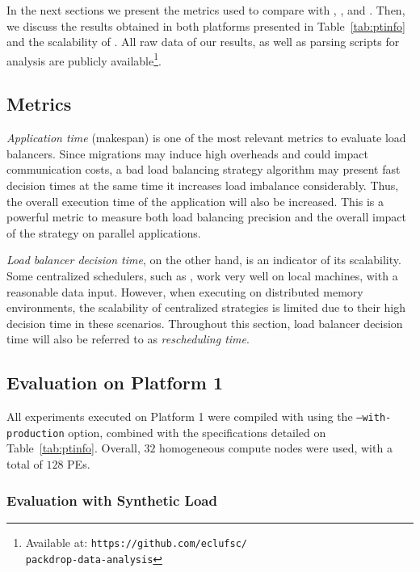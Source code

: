In the next sections we present the metrics used to compare \packdrop with \greedylb, , \distributedlb and \dummylb.
Then, we discuss the results obtained in both platforms presented in Table~\ref{tab:ptinfo} and the scalability of \packdrop.
All raw data of our results, as well as parsing scripts for analysis are publicly available\footnote{Available at: \texttt{https://github.com/eclufsc/\\packdrop-data-analysis}}.

\subsection{Metrics}

\textit{Application time} (makespan) is one of the most relevant metrics to evaluate load balancers.
Since migrations may induce high overheads and could impact communication costs, a bad load balancing strategy algorithm may present fast decision times at the same time it increases load imbalance considerably. Thus, the overall execution time of the application will also be increased.
This is a powerful metric to measure both load balancing precision and the overall impact of the strategy on parallel applications.

\textit{Load balancer decision time}, on the other hand, is an indicator of its scalability.
Some centralized schedulers, such as \greedylb, work very well on local machines, with a reasonable data input.
However, when executing on distributed memory environments, the scalability of centralized strategies is limited due to their high decision time in these scenarios.
Throughout this section, load balancer decision time will also be referred to as \textit{rescheduling time}.

\subsection{Evaluation on Platform 1} \label{sec:cluster}

All experiments executed on Platform 1 were compiled with \charm using the {\small\texttt{--with-production}} option, combined with the specifications detailed on Table~\ref{tab:ptinfo}.
Overall, $32$ homogeneous compute nodes were used, with a total of $128$ PEs.

\subsubsection{Evaluation with Synthetic Load} \label{sec:cluster:lbtest}

